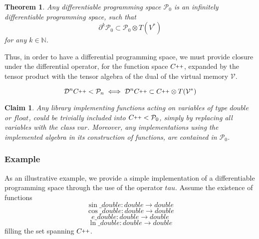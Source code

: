 \documentclass{article}
\newcommand{\VV}{\mathcal{V}}
\newcommand{\CC}{C\nolinebreak\hspace{-.05em}\raisebox{.4ex}{\tiny\bf +}\nolinebreak\hspace{-.10em}\raisebox{.4ex}{\tiny\bf +}}
\def\CC{{C\nolinebreak[4]\hspace{-.05em}\raisebox{.4ex}{\tiny\bf ++}}}
\newcommand{\dP}{\mathcal{P}}
\newcommand{\D}{\partial}
\newcommand{\DD}{\mathcal{D}}
\newtheorem{trditev}{Claim}[section]
\newtheorem{izrek}{Theorem}[section]
\begin{document}
              \begin{izrek}\label{izr:P}
              	Any differentiable programming space $\dP_0$ is an
                infinitely differentiable programming space, such that
              	\begin{equation}\label{eq:P_n}
              	 		\D^k\dP_0\subset\dP_0\otimes T(V^*)
              	 	\end{equation}
              for any $k\in\mathbb{N}$.
              \end{izrek}
              
              Thus, in order to have a differential programming space, we must provide closure under the differential operator, for the function space $\CC$, expanded by the tensor product with the tensor algebra of the dual of the virtual memory $\VV$.
              
              \begin{equation}
              \DD^n\CC<\dP_n\iff\DD^n\CC\subset\CC\otimes T(\VV^*)
              \end{equation}

\begin{trditev}
Any library implementing functions acting on variables of type $double$ or $float$, could be trivially included into $\CC<\dP_0$, simply by replacing all variables with the class $var$. Moreover, any implementations using the implemented algebra in its construction of functions, are contained in $\dP_0$.
\end{trditev}

\subsubsection{Example}
  
As an illustrative example, we provide a simple implementation of a differentiable programming space through the use of the operator $tau$. Assume the existence of functions
\begin{equation}
\sin\_double:double\to double
\end{equation}
\begin{equation}
\cos\_double:double\to double
\end{equation} 
\begin{equation}
e\_double:double\to double
\end{equation}  
\begin{equation}
\ln\_double:double\to double
\end{equation} 
filling the set spanning $\CC$.
\end{document}
